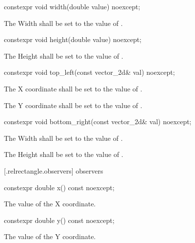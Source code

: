 \begin{itemdecl}
constexpr void width(double value) noexcept;
\end{itemdecl}
\begin{itemdescr}
\pnum
\effects
The Width shall be set to the value of .
\end{itemdescr}

\begin{itemdecl}
constexpr void height(double value) noexcept;
\end{itemdecl}
\begin{itemdescr}
\pnum
\effects
The Height shall be set to the value of .
\end{itemdescr}

\begin{itemdecl}
constexpr void top_left(const vector_2d& val) noexcept;
\end{itemdecl}
\begin{itemdescr}
\pnum
\effects
The X coordinate shall be set to the value of .

\effects
The Y coordinate shall be set to the value of .
\end{itemdescr}

\begin{itemdecl}
constexpr void bottom_right(const vector_2d& val) noexcept;
\end{itemdecl}
\begin{itemdescr}
\pnum
\effects
The Width shall be set to the value of .

\pnum
The Height shall be set to the value of .
\end{itemdescr}

 [\iotwod.relrectangle.observers]{ observers}

\begin{itemdecl}
constexpr double x() const noexcept;
\end{itemdecl}
\begin{itemdescr}
\pnum
\returns
The value of the X coordinate.
\end{itemdescr}

\begin{itemdecl}
constexpr double y() const noexcept;
\end{itemdecl}
\begin{itemdescr}
\pnum
\returns
The value of the Y coordinate.
\end{itemdescr}

